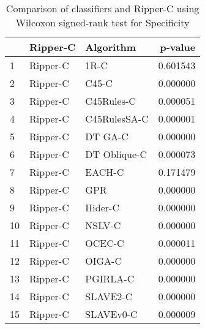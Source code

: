 \begin{table}
\footnotesize
\caption{Comparison of classifiers and Ripper-C using Wilcoxon signed-rank test for Specificity}
\label{tab:Ripper-C wilcoxon Specificity comparison}
\begin{tabular}{lllr}
\hline
 & Ripper-C & Algorithm & p-value \\
\hline
1 & Ripper-C & 1R-C & 0.601543 \\
2 & Ripper-C & C45-C & 0.000000 \\
3 & Ripper-C & C45Rules-C & 0.000051 \\
4 & Ripper-C & C45RulesSA-C & 0.000001 \\
5 & Ripper-C & DT GA-C & 0.000000 \\
6 & Ripper-C & DT Oblique-C & 0.000073 \\
7 & Ripper-C & EACH-C & 0.171479 \\
8 & Ripper-C & GPR & 0.000000 \\
9 & Ripper-C & Hider-C & 0.000000 \\
10 & Ripper-C & NSLV-C & 0.000000 \\
11 & Ripper-C & OCEC-C & 0.000011 \\
12 & Ripper-C & OIGA-C & 0.000000 \\
13 & Ripper-C & PGIRLA-C & 0.000000 \\
14 & Ripper-C & SLAVE2-C & 0.000000 \\
15 & Ripper-C & SLAVEv0-C & 0.000009 \\
\hline
\end{tabular}
\end{table}
